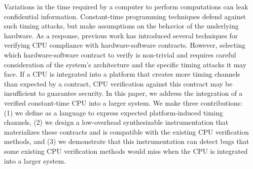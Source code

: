 Variations in the time required by a computer to perform computations can leak confidential information.
Constant-time programming techniques defend against such timing attacks, but make assumptions on the behavior of the underlying hardware.
As a response, previous work has introduced several techniques for verifying CPU compliance with hardware-software contracts.
%
However, selecting which hardware-software contract to verify is non-trivial and requires careful consideration of the system's architecture and the specific timing attacks it may face.
If a CPU is integrated into a platform that creates more timing channels than expected by a contract, CPU verification against this contract may be insufficient to guarantee security.
In this paper, we address the integration of a verified constant-time CPU into a larger system.
We make three contributions: (1) we define \pics as a language to express expected platform-induced timing channels, (2) we design a low-overhead synthesizable instrumentation that materializes these contracts and is compatible with the existing CPU verification methods, and (3) we demonstrate that this instrumentation can detect bugs that some existing CPU verification methods would miss when the CPU is integrated into a larger system.

